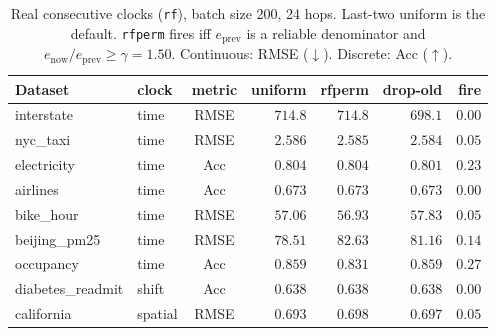 \begin{table}[ht]\centering
\caption{Real consecutive clocks (\texttt{rf}), batch size 200,
24 hops. Last-two uniform is the default. \texttt{rfperm} fires
iff $e_{\mathrm{prev}}$ is a reliable denominator and $e_{\mathrm{now}}/e_{\mathrm{prev}}\ge\gamma=1.50$.
Continuous: RMSE ($\downarrow$). Discrete: Acc ($\uparrow$).}
\label{tab:po-refit-real-rf}
\small
\setlength{\tabcolsep}{3.2pt}
\begin{tabular}{@{}llcrrrr@{}}\toprule
Dataset & clock & metric & uniform & rfperm & drop-old & fire \\
\midrule
interstate & time & RMSE & $714.8$ & $714.8$ & $\mathbf{698.1}$ & $0.00$ \\
nyc\_taxi & time & RMSE & $2.586$ & $2.585$ & $\mathbf{2.584}$ & $0.05$ \\
electricity & time & Acc & $\mathbf{0.804}$ & $\mathbf{0.804}$ & $0.801$ & $0.23$ \\
airlines & time & Acc & $\mathbf{0.673}$ & $\mathbf{0.673}$ & $\mathbf{0.673}$ & $0.00$ \\
bike\_hour & time & RMSE & $57.06$ & $\mathbf{56.93}$ & $57.83$ & $0.05$ \\
beijing\_pm25 & time & RMSE & $\mathbf{78.51}$ & $82.63$ & $81.16$ & $0.14$ \\
occupancy & time & Acc & $\mathbf{0.859}$ & $0.831$ & $\mathbf{0.859}$ & $0.27$ \\
diabetes\_readmit & shift & Acc & $\mathbf{0.638}$ & $\mathbf{0.638}$ & $\mathbf{0.638}$ & $0.00$ \\
california & spatial & RMSE & $\mathbf{0.693}$ & $0.698$ & $0.697$ & $0.05$ \\
\bottomrule
\end{tabular}
\end{table}

